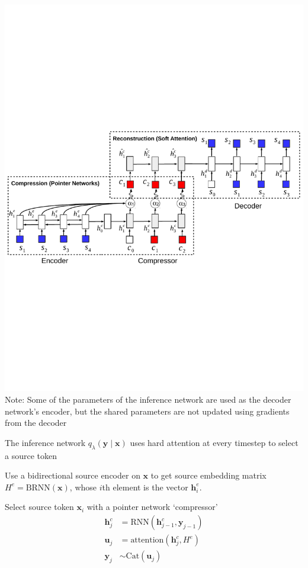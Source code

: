 \documentclass{beamer}
\let\tempone\itemize
\let\temptwo\enditemize
\renewenvironment{itemize}{\tempone\addtolength{\itemsep}{0.5\baselineskip}}{\temptwo}
\newcommand{\bx}{\mathbf{x}}
\newcommand{\by}{\mathbf{y}}
\newcommand{\bh}{\mathbf{h}}
\newcommand{\bu}{\mathbf{u}}
\begin{document}
\begin{frame}
\begin{center}
\end{center}
\center
\includegraphics[scale=0.5]{img/aec.pdf}
Note: Some of the parameters of the inference network
are used as the decoder network's encoder, but the shared parameters are not updated
using gradients from the decoder
\end{frame}

\begin{frame}
\begin{center}
\end{center}
\begin{itemize}
\item The inference network $q_\lambda(\by\mid\bx)$
uses hard attention at every timestep to select a source token
\item Use a bidirectional source encoder on $\bx$ to get source embedding matrix
$H^e = \textrm{BRNN}(\bx)$, whose $i$th element is the vector $\bh_i^e$.
\item Select source token $\bx_i$ with a pointer network `compressor'
\begin{align}
\bh_j^c &= \textrm{RNN}(\bh_{j-1}^c, \by_{j-1})\\
\bu_j &= \textrm{attention}(\bh_j^c, H^e)\\
\by_j &\sim \textrm{Cat}(\bu_j)
\end{align}
\end{itemize}
\end{frame}
\end{document}
